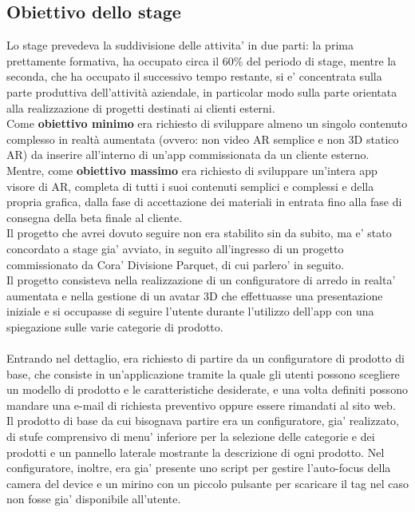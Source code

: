 \subsection{Obiettivo dello stage}
Lo stage prevedeva la suddivisione delle attivita' in due parti: la prima prettamente formativa, ha occupato circa il 60\% del periodo di stage, mentre la seconda, che ha occupato il successivo tempo restante, si e' concentrata sulla parte produttiva dell’attività aziendale, in particolar modo sulla parte orientata alla realizzazione di progetti destinati ai clienti esterni.
\\
Come \textbf{obiettivo minimo} era richiesto di sviluppare almeno un singolo contenuto complesso in realtà aumentata (ovvero: non video AR semplice e non 3D statico AR) da inserire all’interno di un’app commissionata da un cliente esterno. 
\\
Mentre, come \textbf{obiettivo massimo} era richiesto di sviluppare un’intera app visore di AR, completa di tutti i suoi contenuti semplici e complessi e della propria grafica, dalla fase di accettazione dei materiali in entrata fino alla fase di consegna della beta finale al cliente.
\\
Il progetto che avrei dovuto seguire non era stabilito sin da subito, ma e' stato concordato a stage gia' avviato, in seguito all'ingresso di un progetto commissionato da Cora' Divisione Parquet, di cui parlero' in seguito.
\\
Il progetto consisteva nella realizzazione di un configuratore di arredo in realta' aumentata e nella gestione di un avatar 3D che effettuasse una presentazione iniziale e si occupasse di seguire l'utente durante l'utilizzo dell'app con una spiegazione sulle varie categorie di prodotto.
\\\\
Entrando nel dettaglio, era richiesto di partire da un configuratore di prodotto di base, che consiste in un'applicazione tramite la quale gli utenti possono scegliere un modello di prodotto e le caratteristiche desiderate, e una volta definiti possono mandare una e-mail di richiesta preventivo oppure essere rimandati al sito web. 
\\
Il prodotto di base da cui bisognava partire era un configuratore, gia' realizzato, di stufe comprensivo di menu' inferiore per la selezione delle categorie e dei prodotti e un pannello laterale mostrante la descrizione di ogni prodotto. Nel configuratore, inoltre, era gia' presente uno script per gestire l'auto-focus della camera del device e un mirino con un piccolo pulsante per scaricare il tag nel caso non fosse gia' disponibile all'utente.
